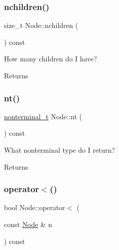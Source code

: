 \mbox{\label{class_node_a5d42219573573f6a91cdfe68fe415505}} 
\subsubsection{\texorpdfstring{nchildren()}{nchildren()}}
{\footnotesize\ttfamily size\+\_\+t Node\+::nchildren (\begin{DoxyParamCaption}{ }\end{DoxyParamCaption}) const\hspace{0.3cm}{\ttfamily [inline]}}

How many children do I have? \begin{DoxyReturn}{Returns}

\end{DoxyReturn}
\mbox{\label{class_node_a4abe3acdc804489a01ef13a25b130fd8}} 
\subsubsection{\texorpdfstring{nt()}{nt()}}
{\footnotesize\ttfamily \hyperlink{_nonterminal_8h_a5c1f658dc7560600a16d22408bd716ca}{nonterminal\+\_\+t} Node\+::nt (\begin{DoxyParamCaption}{ }\end{DoxyParamCaption}) const\hspace{0.3cm}{\ttfamily [inline]}}

What nonterminal type do I return? \begin{DoxyReturn}{Returns}

\end{DoxyReturn}
\mbox{\label{class_node_a8b05feb361beb04d465619751a2297b1}} 
\subsubsection{\texorpdfstring{operator$<$()}{operator<()}}
{\footnotesize\ttfamily bool Node\+::operator$<$ (\begin{DoxyParamCaption}\item[{const \hyperlink{class_node}{Node} \&}]{n }\end{DoxyParamCaption}) const\hspace{0.3cm}{\ttfamily [inline]}}

